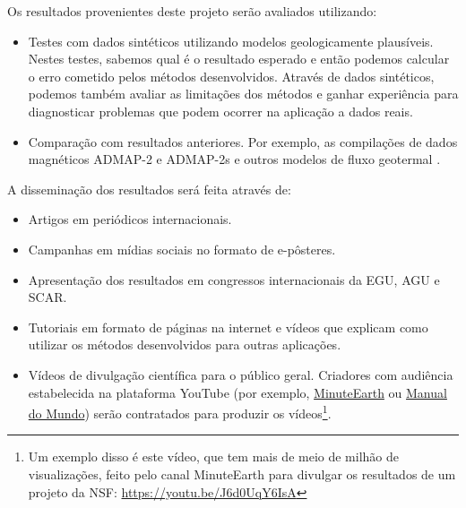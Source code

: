 \documentclass[12pt,a4paper,oneside]{book}
\renewcommand{\chaptermark}[1]{\markboth{#1}{}}
\begin{document}
Os resultados provenientes deste projeto serão avaliados utilizando:

\begin{itemize}
  \item Testes com dados sintéticos utilizando modelos geologicamente
    plausíveis. Nestes testes, sabemos qual é o resultado esperado e então
    podemos calcular o erro cometido pelos métodos desenvolvidos. Através de
    dados sintéticos, podemos também avaliar as limitações dos métodos e ganhar
    experiência para diagnosticar problemas que podem ocorrer na aplicação a
    dados reais.
  \item Comparação com resultados anteriores. Por exemplo, as compilações de
    dados magnéticos ADMAP-2 e ADMAP-2s \citep{Golynsky2018, Kim2022} e outros
    modelos de fluxo geotermal \citep{FoxMaule2005, Losing2021, Losing2020,
    Stal2021}.
\end{itemize}

\noindent
A disseminação dos resultados será feita através de:

\begin{itemize}
  \item Artigos em periódicos internacionais.
  \item Campanhas em mídias sociais no formato de e-pôsteres.
  \item Apresentação dos resultados em congressos internacionais da EGU, AGU e
    SCAR.
  \item Tutoriais em formato de páginas na internet e vídeos que explicam como
    utilizar os métodos desenvolvidos para outras aplicações.
  \item Vídeos de divulgação científica para o público geral. Criadores com
    audiência estabelecida na plataforma YouTube (por exemplo,
    \href{https://www.youtube.com/@MinuteEarth}{MinuteEarth} ou
    \href{https://www.youtube.com/@manualdomundo}{Manual do Mundo})
    serão contratados para produzir os vídeos\footnote{Um exemplo disso é este
    vídeo, que tem mais de meio de milhão de visualizações, feito pelo canal
    MinuteEarth para divulgar os resultados de um projeto da NSF:
    \url{https://youtu.be/J6d0UqY6IsA}}.
\end{itemize}

\backmatter


\chaptermark{Referências Bibliográficas}
\end{document}
